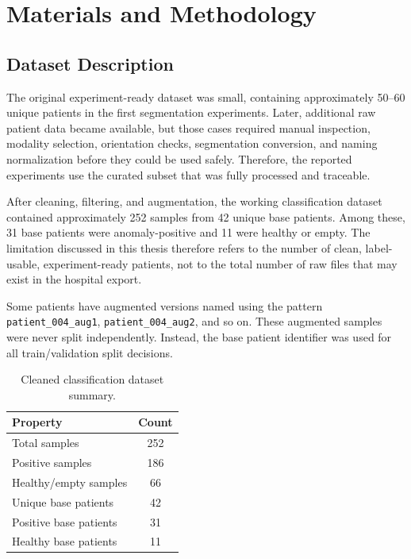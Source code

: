 \chapter{Materials and Methodology}
\label{ch:method}

\section{Dataset Description}
The original experiment-ready dataset was small, containing approximately 50--60 unique patients in the first segmentation experiments. Later, additional raw patient data became available, but those cases required manual inspection, modality selection, orientation checks, segmentation conversion, and naming normalization before they could be used safely. Therefore, the reported experiments use the curated subset that was fully processed and traceable.

After cleaning, filtering, and augmentation, the working classification dataset contained approximately 252 samples from 42 unique base patients. Among these, 31 base patients were anomaly-positive and 11 were healthy or empty. The limitation discussed in this thesis therefore refers to the number of clean, label-usable, experiment-ready patients, not to the total number of raw files that may exist in the hospital export.

Some patients have augmented versions named using the pattern \texttt{patient\_004\_aug1}, \texttt{patient\_004\_aug2}, and so on. These augmented samples were never split independently. Instead, the base patient identifier was used for all train/validation split decisions.

\begin{table}[H]
    \centering
    \caption{Cleaned classification dataset summary.}
    \label{tab:dataset_summary}
    \begin{tabular}{l|c}
        \hline
        \textbf{Property} & \textbf{Count} \\
        \hline
        Total samples & 252 \\
        Positive samples & 186 \\
        Healthy/empty samples & 66 \\
        Unique base patients & 42 \\
        Positive base patients & 31 \\
        Healthy base patients & 11 \\
        \hline
    \end{tabular}
\end{table}

